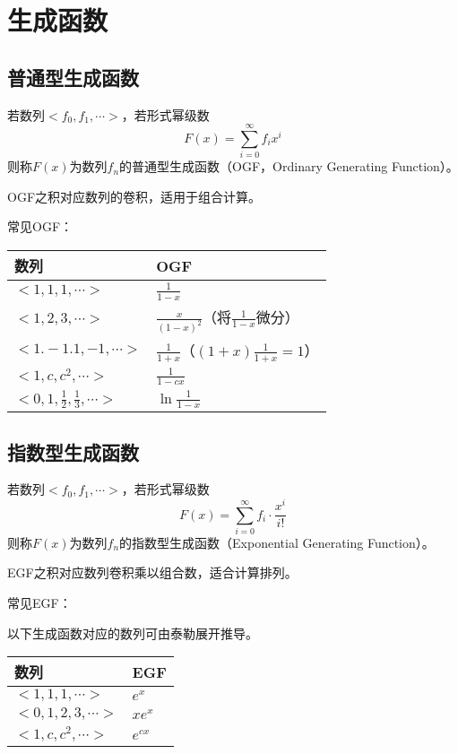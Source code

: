 \section{生成函数}\label{GF}
\subsection{普通型生成函数}
若数列$<f_0,f_1,\cdots>$，若形式幂级数
\begin{displaymath}
	F(x)=\sum_{i=0}^\infty{f_ix^i}
\end{displaymath}
则称$F(x)$为数列${f_n}$的普通型生成函数（OGF，Ordinary Generating Function）。

OGF之积对应数列的卷积，适用于组合计算。

常见OGF：

\begin{tabular}{|l|l|}
	\hline
	数列                                   & OGF                                          \\
	\hline
	$<1,1,1,\cdots>$                       & $\frac{1}{1-x}$                              \\
	\hline
	$<1,2,3,\cdots>$                       & $\frac{x}{(1-x)^2}$（将$\frac{1}{1-x}$微分） \\
	\hline
	$<1.-1.1,-1,\cdots>$                   & $\frac{1}{1+x}$（$(1+x)\frac{1}{1+x}=1$）    \\
	\hline
	$<1,c,c^2,\cdots>$                     & $\frac{1}{1-cx}$                             \\
	\hline
	$<0,1,\frac{1}{2},\frac{1}{3},\cdots>$ & $\ln\frac{1}{1-x}$                           \\
	\hline
\end{tabular}
\subsection{指数型生成函数}
若数列$<f_0,f_1,\cdots>$，若形式幂级数
\begin{displaymath}
	F(x)=\sum_{i=0}^\infty{f_i\cdot\frac{x^i}{i!}}
\end{displaymath}
则称$F(x)$为数列${f_n}$的指数型生成函数（Exponential Generating Function）。

EGF之积对应数列卷积乘以组合数，适合计算排列。

常见EGF：

以下生成函数对应的数列可由泰勒展开推导。

\begin{tabular}{|l|l|}
	\hline
	数列               & EGF      \\
	\hline
	$<1,1,1,\cdots>$   & $e^x$    \\
	\hline
	$<0,1,2,3,\cdots>$ & $xe^x$   \\
	\hline
	$<1,c,c^2,\cdots>$ & $e^{cx}$ \\
	\hline
\end{tabular}

